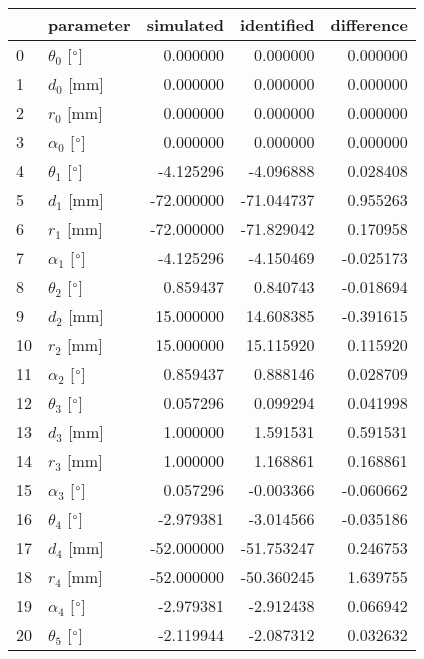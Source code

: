 \documentclass{standalone}%
\begin{document}
%
\normalsize%
\begin{tabular}{llrrr}
\toprule
{} &                 parameter &   simulated &  identified & difference \\
\midrule
0  &  $\theta_{0}$ [$\degree$] &    0.000000 &    0.000000 &   0.000000 \\
1  &              $d_{0}$ [mm] &    0.000000 &    0.000000 &   0.000000 \\
2  &              $r_{0}$ [mm] &    0.000000 &    0.000000 &   0.000000 \\
3  &  $\alpha_{0}$ [$\degree$] &    0.000000 &    0.000000 &   0.000000 \\
4  &  $\theta_{1}$ [$\degree$] &   -4.125296 &   -4.096888 &   0.028408 \\
5  &              $d_{1}$ [mm] &  -72.000000 &  -71.044737 &   0.955263 \\
6  &              $r_{1}$ [mm] &  -72.000000 &  -71.829042 &   0.170958 \\
7  &  $\alpha_{1}$ [$\degree$] &   -4.125296 &   -4.150469 &  -0.025173 \\
8  &  $\theta_{2}$ [$\degree$] &    0.859437 &    0.840743 &  -0.018694 \\
9  &              $d_{2}$ [mm] &   15.000000 &   14.608385 &  -0.391615 \\
10 &              $r_{2}$ [mm] &   15.000000 &   15.115920 &   0.115920 \\
11 &  $\alpha_{2}$ [$\degree$] &    0.859437 &    0.888146 &   0.028709 \\
12 &  $\theta_{3}$ [$\degree$] &    0.057296 &    0.099294 &   0.041998 \\
13 &              $d_{3}$ [mm] &    1.000000 &    1.591531 &   0.591531 \\
14 &              $r_{3}$ [mm] &    1.000000 &    1.168861 &   0.168861 \\
15 &  $\alpha_{3}$ [$\degree$] &    0.057296 &   -0.003366 &  -0.060662 \\
16 &  $\theta_{4}$ [$\degree$] &   -2.979381 &   -3.014566 &  -0.035186 \\
17 &              $d_{4}$ [mm] &  -52.000000 &  -51.753247 &   0.246753 \\
18 &              $r_{4}$ [mm] &  -52.000000 &  -50.360245 &   1.639755 \\
19 &  $\alpha_{4}$ [$\degree$] &   -2.979381 &   -2.912438 &   0.066942 \\
20 &  $\theta_{5}$ [$\degree$] &   -2.119944 &   -2.087312 &   0.032632 \\

\end{tabular}
\end{document}
